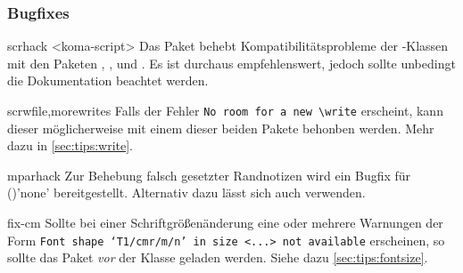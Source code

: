 \subsubsection{Bugfixes}
\begin{packages}
\item[scrhack]<koma-script>
  Das Paket behebt Kompatibilitätsprobleme der \KOMAScript-Klassen mit den 
  Paketen , ,  und
  . Es ist durchaus empfehlenswert, jedoch sollte unbedingt 
  die Dokumentation beachtet werden.
\item[scrwfile,morewrites]
  Falls der Fehler \texttt{No room for a new \textbackslash write} erscheint, 
  kann dieser möglicherweise mit einem dieser beiden Pakete behonben werden. 
  Mehr dazu in \autoref{sec:tips:write}.
\item[mparhack]
  Zur Behebung falsch gesetzter Randnotizen wird ein Bugfix für 
  ()'none' bereitgestellt. Alternativ 
  dazu lässt sich auch  verwenden.
\item[fix-cm]
  Sollte bei einer Schriftgrößenänderung eine oder mehrere Warnungen der Form 
  \texttt{Font shape `T1/cmr/m/n' in size <...> not available} erscheinen, so 
  sollte das Paket  \emph{vor} der Klasse geladen werden. Siehe 
  dazu \autoref{sec:tips:fontsize}.
\end{packages}
